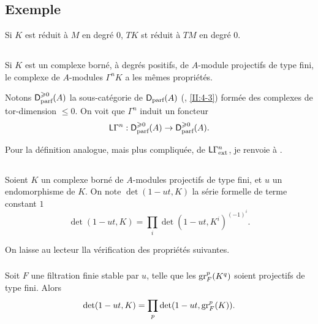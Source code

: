 \documentclass[oneside]{book}
\begin{document}
\subsection{Exemple}\label{III:1-5}

Si $K$ est r\'eduit \`a $M$ en degr\'e $0$, $T K$ st r\'eduit \`a $T M$ en 
degr\'e $0$. 





\subsection{}\label{III:1-6}

Si $K$ est un complexe born\'e, \`a degr\'es positifs, de $A$-module projectifs 
de type fini, le complexe de $A$-modules $\Gamma^n K$ a les m\^emes 
propri\'et\'es. 

Notons $\mathsf{D}_\text{parf}^{\geqslant 0}(A)$ la sous-cat\'egorie de 
$\mathsf{D}_\text{parf}(A)$ (, \ref{II:4-3}) form\'ee des complexes de 
tor-dimension $\leqslant 0$. On voit que $\Gamma^n$ induit un foncteur 
\[
  \mathsf{L}\Gamma^n : \mathsf{D}_\text{parf}^{\geqslant 0}(A) \to \mathsf{D}_\text{parf}^{\geqslant 0}(A) \text{.}
\]

Pour la d\'efinition analogue, mais plus compliqu\'ee, de 
$\mathsf{L}\Gamma_\text{ext}^n$, je renvoie \`a \cite[XVII 5.5.14]{4}. 





\subsection{}\label{III:1-7}

Soient $K$ un complexe born\'e de $A$-modules projectifs de type fini, et $u$ 
un endomorphisme de $K$. On note $\det(1-u t,K)$ la s\'erie formelle de terme 
constant $1$ 
\[
  \det(1-u t,K) = \prod_i \det(1-u t,K^i)^{(-1)^i} \text{.}
\]

On laisse au lecteur lla v\'erification des propri\'et\'es suivantes. 


\subsubsection{}\label{III:1-7-1}

Soit $F$ une filtration finie stable par $u$, telle que les $\operatorname{gr}_F^p(K^q)$ 
soient projectifs de type fini. Alors 
\[
  \det(1-u t,K) = \prod_p \det(1-u t,\operatorname{gr}_F^p(K)) \text{.}
\]


\subsubsection{}\label{III:7-2}
\end{document}
